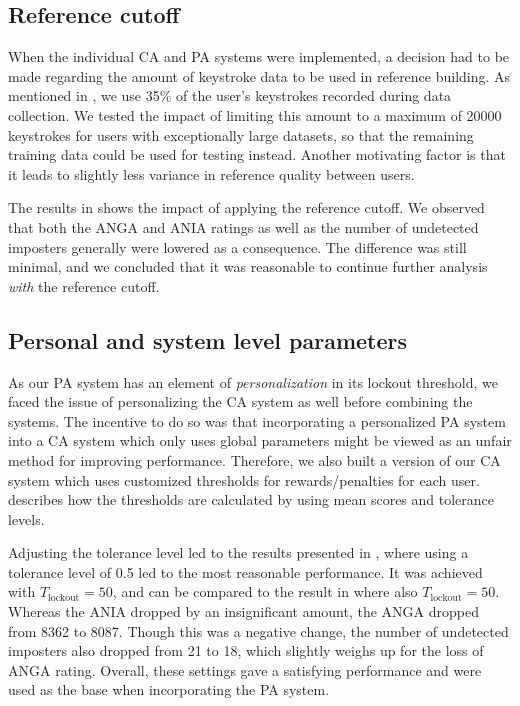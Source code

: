 
\subsection{Reference cutoff}
\label{sec:analysis-cutoff}
When the individual CA and PA systems were implemented, a decision had to be made regarding the amount of keystroke data to be used in reference building.
As mentioned in , we use 35\% of the user's keystrokes recorded during data collection.
We tested the impact of limiting this amount to a maximum of 20000 keystrokes for users with exceptionally large datasets, so that the remaining training data could be used for testing instead.
Another motivating factor is that it leads to slightly less variance in reference quality between users.

The results in  shows the impact of applying the reference cutoff.
We observed that both the ANGA and ANIA ratings as well as the number of undetected imposters generally were lowered as a consequence.
The difference was still minimal, and we concluded that it was reasonable to continue further analysis \textit{with} the reference cutoff.

\subsection{Personal and system level parameters}
\label{sec:CA-personal-parameters}
As our PA system has an element of \textit{personalization} in its lockout threshold, we faced the issue of personalizing the CA system as well before combining the systems.
The incentive to do so was that incorporating a personalized PA system into a CA system which only uses global parameters might be viewed as an unfair method for improving performance.
Therefore, we also built a version of our CA system which uses customized thresholds for rewards/penalties for each user.
 describes how the thresholds are calculated by using mean scores and tolerance levels.

Adjusting the tolerance level led to the results presented in , where using a tolerance level of 0.5 led to the most reasonable performance.
It was achieved with $T_{\text{lockout}}=50$, and can be compared to the result in  where also $T_{\text{lockout}} = 50$.
Whereas the ANIA dropped by an insignificant amount, the ANGA dropped from 8362 to 8087.
Though this was a negative change, the number of undetected imposters also dropped from 21 to 18, which slightly weighs up for the loss of ANGA rating.
Overall, these settings gave a satisfying performance and were used as the base when incorporating the PA system.

